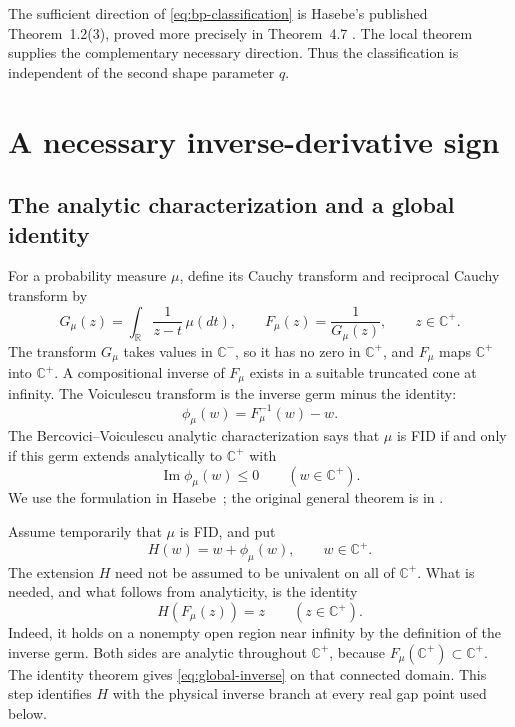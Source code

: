 \documentclass[11pt,a4paper]{article}
\theoremstyle{definition}
\theoremstyle{remark}
\newcommand{\R}{\mathbb R}
\newcommand{\Cp}{\mathbb C^+}
\newcommand{\Cm}{\mathbb C^-}
\DeclareMathOperator{\Imn}{Im}
\begin{document}
The sufficient direction of \eqref{eq:bp-classification} is Hasebe's
published Theorem~1.2(3), proved more precisely in Theorem~4.7
\cite{Hasebe2014}. The local theorem supplies the complementary
necessary direction. Thus the classification is independent of the
second shape parameter $q$.

\section{A necessary inverse-derivative sign}

\subsection{The analytic characterization and a global identity}

For a probability measure $\mu$, define its Cauchy transform and
reciprocal Cauchy transform by
\begin{equation}\label{eq:G-F}
 G_\mu(z)=\int_\R\frac{1}{z-t}\,\mu(dt),\qquad
 F_\mu(z)=\frac1{G_\mu(z)},\qquad z\in\Cp.
\end{equation}
The transform $G_\mu$ takes values in $\Cm$, so it has no zero in
$\Cp$, and $F_\mu$ maps $\Cp$ into $\Cp$. A compositional inverse
of $F_\mu$ exists in a suitable truncated cone at infinity. The
Voiculescu transform is the inverse germ minus the identity:
\[
 \phi_\mu(w)=F_\mu^{-1}(w)-w.
\]
The Bercovici--Voiculescu analytic characterization says that $\mu$
is FID if and only if this germ extends analytically to $\Cp$ with
\begin{equation}\label{eq:pick}
 \Imn\phi_\mu(w)\le0\qquad(w\in\Cp).
\end{equation}
We use the formulation in Hasebe~\cite[Theorem~2.4]{Hasebe2014};
the original general theorem is in \cite{BV1993}.

Assume temporarily that $\mu$ is FID, and put
\begin{equation}\label{eq:H}
 H(w)=w+\phi_\mu(w),\qquad w\in\Cp.
\end{equation}
The extension $H$ need not be assumed to be univalent on all of
$\Cp$. What is needed, and what follows from analyticity, is the
identity
\begin{equation}\label{eq:global-inverse}
 H(F_\mu(z))=z\qquad(z\in\Cp).
\end{equation}
Indeed, it holds on a nonempty open region near infinity by the
definition of the inverse germ. Both sides are analytic throughout
$\Cp$, because $F_\mu(\Cp)\subset\Cp$. The identity theorem gives
\eqref{eq:global-inverse} on that connected domain. This step
identifies $H$ with the physical inverse branch at every real gap
point used below.
\end{document}
